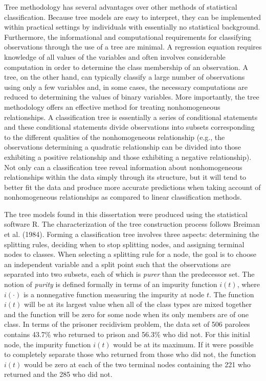 Tree methodology has several advantages over other methods of statistical classification.  Because tree models are easy to interpret, they can be implemented within practical settings by individuals with essentially no statistical background.  Furthermore, the informational and computational requirements for classifying observations through the use of a tree are minimal.  A regression equation requires knowledge of all values of the variables and often involves considerable computation in order to determine the class membership of an observation.  A tree, on the other hand, can typically classify a large number of observations using only a few variables and, in some cases, the necessary computations are reduced to determining the values of binary variables.  More importantly, the tree methodology offers an effective method for treating nonhomogeneous relationships.  A classification tree is essentially a series of conditional statements and these conditional statements divide observations into subsets corresponding to the different qualities of the nonhomogeneous relationship (e.g., the observations determining a quadratic relationship can be divided into those exhibiting a positive relationship and those exhibiting a negative relationship).  Not only can a classification tree reveal information about nonhomogeneous relationships within the data simply through its structure, but it will tend to better fit the data and produce more accurate predictions when taking account of nonhomogeneous relationships as compared to linear classification methods.

The tree models found in this dissertation were produced using the statistical software R.  The characterization of the tree construction process follows Breiman et al. (1984).  Forming a classification tree involves three aspects:  determining the splitting rules, deciding when to stop splitting nodes, and assigning terminal nodes to classes.  When selecting a splitting rule for a node, the goal is to choose an independent variable and a split point such that the observations are separated into two subsets, each of which is \emph{purer} than the predecessor set.  The notion of \emph{purity} is defined formally in terms of an impurity function $i(t)$, where $i( \cdot )$ is a nonnegative function measuring the impurity at node $t$.  The function $i(t)$ will be at its largest value when all of the class types are mixed together and the function will be zero for some node when its only members are of one class.  In terms of the prisoner recidivism problem, the data set of 506 parolees contains 43.7\% who returned to prison and 56.3\% who did not.  For this initial node, the impurity function $i(t)$ would be at its maximum.  If it were possible to completely separate those who returned from those who did not, the function $i(t)$ would be zero at each of the two terminal nodes containing the 221 who returned and the 285 who did not.

